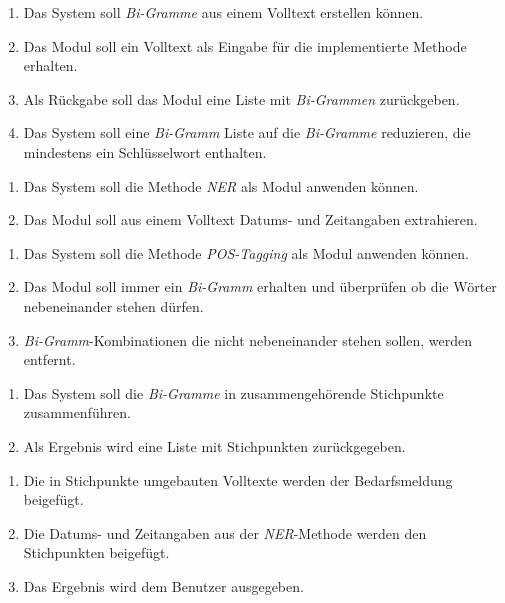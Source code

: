 \begin{enumerate}[label=5.\arabic*]
	\item Das System soll \emph{Bi-Gramme} aus einem Volltext erstellen können.
	\item Das Modul soll ein Volltext als Eingabe für die implementierte Methode erhalten.
	\item Als Rückgabe soll das Modul eine Liste mit \emph{Bi-Grammen} zurückgeben.
	\item Das System soll eine \emph{Bi-Gramm} Liste auf die \emph{Bi-Gramme} reduzieren, die mindestens ein Schlüsselwort enthalten.
\end{enumerate}
\begin{enumerate}[label=6.\arabic*]
	\item Das System soll die Methode \emph{NER} als Modul anwenden können.
	\item Das Modul soll aus einem Volltext Datums- und Zeitangaben extrahieren.
\end{enumerate}
\begin{enumerate}[label=7.\arabic*]
	\item Das System soll die Methode \emph{POS-Tagging} als Modul anwenden können.
	\item Das Modul soll immer ein \emph{Bi-Gramm} erhalten und überprüfen ob die Wörter nebeneinander stehen dürfen.
	\item \emph{Bi-Gramm}-Kombinationen die nicht nebeneinander stehen sollen, werden entfernt.
\end{enumerate}
\begin{enumerate}[label=8.\arabic*]
	\item Das System soll die \emph{Bi-Gramme} in zusammengehörende Stichpunkte zusammenführen.
	\item Als Ergebnis wird eine Liste mit Stichpunkten zurückgegeben.
\end{enumerate}
\begin{enumerate}[label=9.\arabic*]
	\item Die in Stichpunkte umgebauten Volltexte werden der Bedarfsmeldung beigefügt.
	\item Die Datums- und Zeitangaben aus der \emph{NER}-Methode werden den Stichpunkten beigefügt.
	\item Das Ergebnis wird dem Benutzer ausgegeben.
\end{enumerate}
